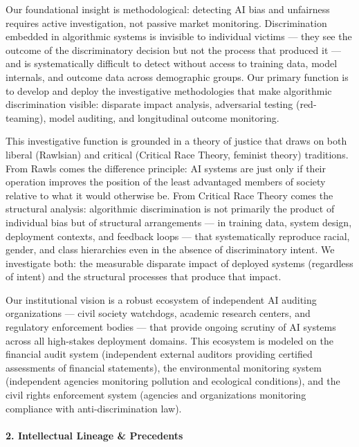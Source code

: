 Our foundational insight is methodological: detecting AI bias and
unfairness requires active investigation, not passive market monitoring.
Discrimination embedded in algorithmic systems is invisible to
individual victims --- they see the outcome of the discriminatory
decision but not the process that produced it --- and is systematically
difficult to detect without access to training data, model internals,
and outcome data across demographic groups. Our primary function is to
develop and deploy the investigative methodologies that make algorithmic
discrimination visible: disparate impact analysis, adversarial testing
(red-teaming), model auditing, and longitudinal outcome monitoring.

This investigative function is grounded in a theory of justice that
draws on both liberal (Rawlsian) and critical (Critical Race Theory,
feminist theory) traditions. From Rawls comes the difference principle:
AI systems are just only if their operation improves the position of the
least advantaged members of society relative to what it would otherwise
be. From Critical Race Theory comes the structural analysis: algorithmic
discrimination is not primarily the product of individual bias but of
structural arrangements --- in training data, system design, deployment
contexts, and feedback loops --- that systematically reproduce racial,
gender, and class hierarchies even in the absence of discriminatory
intent. We investigate both: the measurable disparate impact of deployed
systems (regardless of intent) and the structural processes that produce
that impact.

Our institutional vision is a robust ecosystem of independent AI
auditing organizations --- civil society watchdogs, academic research
centers, and regulatory enforcement bodies --- that provide ongoing
scrutiny of AI systems across all high-stakes deployment domains. This
ecosystem is modeled on the financial audit system (independent external
auditors providing certified assessments of financial statements), the
environmental monitoring system (independent agencies monitoring
pollution and ecological conditions), and the civil rights enforcement
system (agencies and organizations monitoring compliance with
anti-discrimination law).

\paragraph{2. Intellectual Lineage \&
Precedents}\label{intellectual-lineage-precedents-10}

